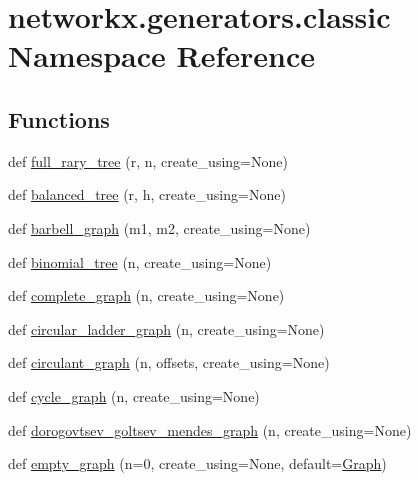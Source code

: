 \hypertarget{namespacenetworkx_1_1generators_1_1classic}{}\section{networkx.\+generators.\+classic Namespace Reference}
\label{namespacenetworkx_1_1generators_1_1classic}
\subsection*{Functions}
\begin{DoxyCompactItemize}
\item 
def \hyperlink{namespacenetworkx_1_1generators_1_1classic_a69efb9b43871ae3c50d10a7103c2cc16}{full\+\_\+rary\+\_\+tree} (r, n, create\+\_\+using=None)
\item 
def \hyperlink{namespacenetworkx_1_1generators_1_1classic_ad756a1d5ee001098fc188872b847ceae}{balanced\+\_\+tree} (r, h, create\+\_\+using=None)
\item 
def \hyperlink{namespacenetworkx_1_1generators_1_1classic_a19042a529358323ae61e72f1bae99690}{barbell\+\_\+graph} (m1, m2, create\+\_\+using=None)
\item 
def \hyperlink{namespacenetworkx_1_1generators_1_1classic_a3b533c7cec64040c4ffdab95fcb98087}{binomial\+\_\+tree} (n, create\+\_\+using=None)
\item 
def \hyperlink{namespacenetworkx_1_1generators_1_1classic_adc64fea09115f5630c489d951d14f7eb}{complete\+\_\+graph} (n, create\+\_\+using=None)
\item 
def \hyperlink{namespacenetworkx_1_1generators_1_1classic_ac284fe1435875ee1af8de0ce688b85a5}{circular\+\_\+ladder\+\_\+graph} (n, create\+\_\+using=None)
\item 
def \hyperlink{namespacenetworkx_1_1generators_1_1classic_abac2eb1c298413c763ae6377ff0c3181}{circulant\+\_\+graph} (n, offsets, create\+\_\+using=None)
\item 
def \hyperlink{namespacenetworkx_1_1generators_1_1classic_a45238aab4d2cb9c9e6541b5e5a8de72c}{cycle\+\_\+graph} (n, create\+\_\+using=None)
\item 
def \hyperlink{namespacenetworkx_1_1generators_1_1classic_a90726aa681ac05681d9c13cbb9c1a06c}{dorogovtsev\+\_\+goltsev\+\_\+mendes\+\_\+graph} (n, create\+\_\+using=None)
\item 
def \hyperlink{namespacenetworkx_1_1generators_1_1classic_a93280f4b436feff8bfd9ea04ec5e74b0}{empty\+\_\+graph} (n=0, create\+\_\+using=None, default=\hyperlink{classnetworkx_1_1classes_1_1graph_1_1Graph}{Graph})

\end{DoxyCompactItemize}
